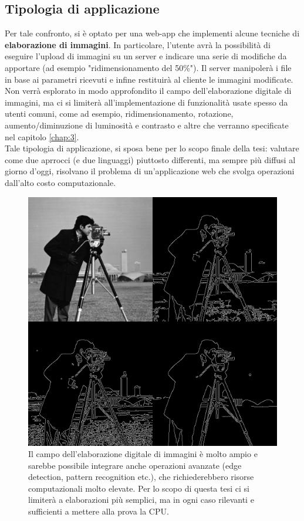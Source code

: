 \subsection{Tipologia di applicazione}
Per tale confronto, si è optato per una web-app che implementi alcune tecniche di \textbf{elaborazione di immagini}.
In particolare, l'utente avrà la possibilità di eseguire l'upload di immagini su un server e indicare una serie di modifiche da apportare (ad esempio "ridimensionamento del 50\%"). Il server manipolerà i file in base ai parametri ricevuti e infine restituirà al cliente le immagini modificate.
\\Non verrà esplorato in modo approfondito il campo dell'elaborazione digitale di immagini, ma ci si limiterà all'implementazione di funzionalità usate spesso da utenti comuni, come ad esempio, ridimensionamento, rotazione, aumento/diminuzione di luminosità e contrasto e altre che verranno specificate nel capitolo \ref{chap:3}.
\\Tale tipologia di applicazione, si sposa bene per lo scopo finale della tesi: valutare come due aprrocci (e due linguaggi) piuttosto differenti, ma sempre più diffusi al giorno d'oggi, risolvano il problema di un'applicazione web che svolga operazioni dall'alto costo computazionale.
\begin{figure}
        \begin{center}
                \includegraphics[width=0.6\columnwidth]{images/imageProc.jpg}
        \end{center}
        \caption[Image Processing]{Il campo dell'elaborazione digitale di immagini è molto ampio e sarebbe possibile integrare anche operazioni avanzate (edge detection, pattern recognition etc.), che richiederebbero risorse computazionali molto elevate. Per lo scopo di questa tesi ci si limiterà a elaborazioni più semplici, ma in ogni caso rilevanti e sufficienti a mettere alla prova la CPU.}
        \label{fig:imageProc}
\end{figure} 
